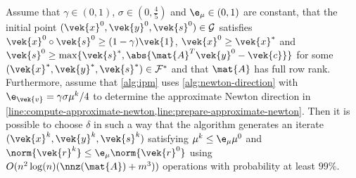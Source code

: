 \begin{theorem}\label{thm:combined-algorithm-convergence}
  Assume that \(\gamma \in (0, 1)\), \(\sigma \in (0, \frac{4}{5})\) and \(\e_\mu \in (0, 1)\) are constant, that the initial point \((\vek{x}^0, \vek{y}^0, \vek{s}^0) \in \mathcal{G}\) satisfies \(\vek{x}^0 \circ \vek{s}^0 \geq (1-\gamma)\vek{1}\), \(\vek{x}^0 \geq \vek{x}^*\) and \(\vek{s}^0 \geq \max \{\vek{s}^*, \abs{\mat{A}^T \vek{y}^0 - \vek{c}}\}\) for some \((\vek{x}^*, \vek{y}^*, \vek{s}^*) \in \mathcal{F}^*\) and that \(\mat{A}\) has full row rank.
  Furthermore, assume that \cref{alg:ipm} uses \cref{alg:newton-direction} with \(\e_{\vek{v}} = \gamma \sigma \mu^k / 4\) to determine the approximate Newton direction in \cref{line:compute-approximate-newton,line:prepare-approximate-newton}.
  Then it is possible to choose \(\delta\) in such a way that the algorithm generates an iterate \((\vek{x}^k, \vek{y}^k, \vek{s}^k)\) satisfying \(\mu^k \leq \e_\mu \mu^0\) and \(\norm{\vek{r}^k} \leq \e_\mu \norm{\vek{r}^0}\) using \(O(n^2 \log(n) (\nnz(\mat{A}) + m^3))\) operations with probability at least \(99\%\).
\end{theorem}

